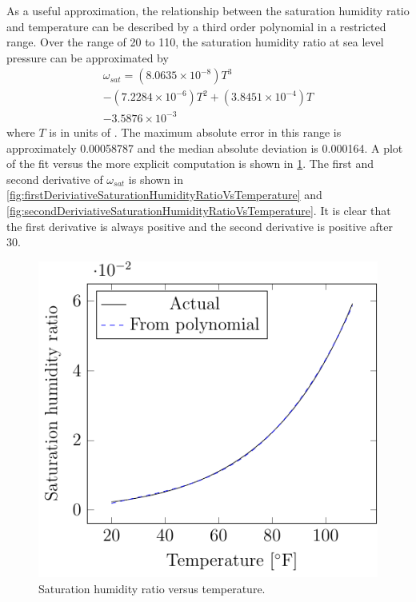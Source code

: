 As a useful approximation, the relationship between the saturation
humidity ratio and temperature can be described by a third order
polynomial in a restricted range. Over the range of \SI{20}{\degreeF} to
\SI{110}{\degreeF}, the saturation humidity ratio at sea level pressure
can be approximated by
\begin{multline}
    \omega_{sat} = \left(8.0635 \times 10^{-8}\right) T^3 \\ 
    - \left(7.2284 \times 10^{-6}\right)  T^2 + \left(3.8451\times 10^{-4}\right) T \\
    -  3.5876\times 10^{-3}
\end{multline}
where \(T\) is in units of \si{\degreeF}. The maximum absolute error in
this range is approximately \num[group-separator={ }]{0.00058787} and the median absolute
deviation is \num[group-separator={ }]{0.000164}. A plot of the fit
versus the more explicit computation is shown in \figref{}
\ref{fig:saturationHumidityRatioVsTemperature}. The first and second
derivative of \(\omega_{sat}\) is shown in \figref{}
\ref{fig:firstDeriviativeSaturationHumidityRatioVsTemperature} and
\figref{}
\ref{fig:secondDeriviativeSaturationHumidityRatioVsTemperature}. It is
clear that the first derivative is always positive and the second
derivative is positive after \SI{30}{\degreeF}.

\begin{figure}
\centering
\includegraphics{Plots/44-SaturatedHumidityVsTemperature/saturationHumidityVsTemperature.pdf}
\caption{Saturation humidity ratio versus temperature.}
\label{fig:saturationHumidityRatioVsTemperature}
\end{figure}


